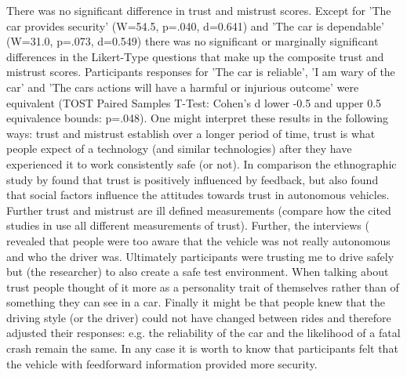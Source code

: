 There was no significant difference in trust and mistrust scores. Except for 'The car provides security' (W=54.5, p=.040, d=0.641) and 'The car is dependable' (W=31.0, p=.073, d=0.549) there was no significant or marginally significant differences in the Likert-Type questions that make up the composite trust and mistrust scores. Participants responses for 'The car is reliable', 'I am wary of the car' and 'The cars actions will have a harmful or injurious outcome' were equivalent (TOST Paired Samples T-Test: Cohen's d lower -0.5 and upper 0.5 equivalence bounds: p=.048).
One might interpret these results in the following ways: trust and mistrust establish over a longer period of time, trust is what people expect of a technology (and similar technologies) after they have experienced it to work consistently safe (or not). In comparison the ethnographic study by \cite{Lee2016} found that trust is positively influenced by feedback, but also found that social factors influence the attitudes towards trust in autonomous vehicles. Further trust and mistrust are ill defined measurements (compare how the cited studies in  use all different measurements of trust). Further, the interviews ( revealed that people were too aware that the vehicle was not really autonomous and who the driver was. Ultimately participants were trusting me to drive safely but (the researcher) to also create a safe test environment. When talking about trust people thought of it more as a personality trait of themselves rather than of something they can see in a car. Finally it might be that people knew that the driving style (or the driver) could not have changed between rides and therefore adjusted their responses: e.g. the reliability of the car and the likelihood of a fatal crash remain the same. In any case it is worth to know that participants felt that the vehicle with feedforward information provided more security. %

